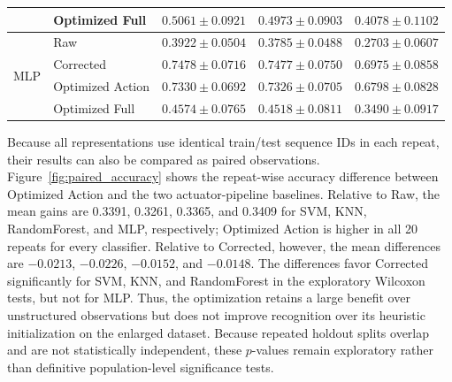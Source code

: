 \documentclass[11pt]{article}
\begin{document}
\begin{table}[!t]
\begin{tabular}{@{}llccc@{}}
& Optimized Full & $0.5061 \pm 0.0921$ & $0.4973 \pm 0.0903$ & $0.4078 \pm 0.1102$ \\
\midrule
\multirow{4}{*}{MLP}
& Raw & $0.3922 \pm 0.0504$ & $0.3785 \pm 0.0488$ & $0.2703 \pm 0.0607$ \\
& Corrected & $\mathbf{0.7478 \pm 0.0716}$ & $\mathbf{0.7477 \pm 0.0750}$ & $\mathbf{0.6975 \pm 0.0858}$ \\
& Optimized Action & $0.7330 \pm 0.0692$ & $0.7326 \pm 0.0705$ & $0.6798 \pm 0.0828$ \\
& Optimized Full & $0.4574 \pm 0.0765$ & $0.4518 \pm 0.0811$ & $0.3490 \pm 0.0917$ \\
\bottomrule
\end{tabular}
\end{table}

Because all representations use identical train/test sequence IDs in each repeat, their results can also be compared as paired observations. Figure~\ref{fig:paired_accuracy} shows the repeat-wise accuracy difference between Optimized Action and the two actuator-pipeline baselines. Relative to Raw, the mean gains are 0.3391, 0.3261, 0.3365, and 0.3409 for SVM, KNN, RandomForest, and MLP, respectively; Optimized Action is higher in all 20 repeats for every classifier. Relative to Corrected, however, the mean differences are $-0.0213$, $-0.0226$, $-0.0152$, and $-0.0148$. The differences favor Corrected significantly for SVM, KNN, and RandomForest in the exploratory Wilcoxon tests, but not for MLP. Thus, the optimization retains a large benefit over unstructured observations but does not improve recognition over its heuristic initialization on the enlarged dataset. Because repeated holdout splits overlap and are not statistically independent, these $p$-values remain exploratory rather than definitive population-level significance tests.
\end{document}
